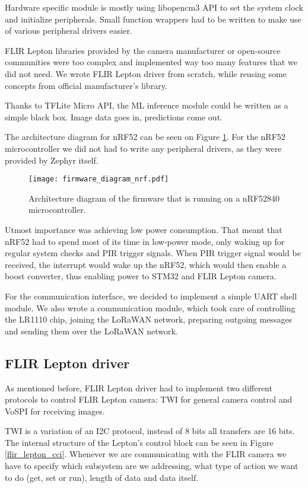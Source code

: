 Hardware specific module is mostly using libopencm3 API to set the system clock and initialize peripherals.
Small function wrappers had to be written to make use of various peripheral drivers easier.

FLIR Lepton libraries provided by the camera manufacturer or open-source communities were too complex and implemented way too many features that we did not need.
We wrote FLIR Lepton driver from scratch, while reusing some concepts from official manufacturer's library.

Thanks to TFLite Micro API, the ML inference module could be written as a simple black box.
Image data goes in, predictions come out.

The architecture diagram for nRF52 can be seen on Figure \ref{firmware_diagram_wisent}.
For the nRF52 microcontroller we did not had to write any peripheral drivers, as they were provided by Zephyr itself.

\begin{figure}[ht]
        \centering
        \texttt{[image: firmware\_diagram\_nrf.pdf]} 
        \caption{ Architecture diagram of the firmware that is running on a nRF52840 microcontroller.} 
        \label{firmware_diagram_wisent}
\end{figure}

Utmost importance was achieving low power consumption.
That meant that nRF52 had to spend most of its time in low-power mode, only waking up for regular system checks and PIR trigger signals.
When PIR trigger signal would be received, the interrupt would wake up the nRF52, which would then enable a boost converter, thus enabling power to STM32 and FLIR Lepton camera.

For the communication interface, we decided to implement a simple UART shell module.
We also wrote a communication module, which took care of controlling the LR1110 chip, joining the LoRaWAN network, preparing outgoing messages and sending them over the LoRaWAN network.


\subsection{ FLIR Lepton driver}

As mentioned before, FLIR Lepton driver had to implement two different protocols to control FLIR Lepton camera: TWI for general camera control and VoSPI for receiving images.

TWI is a variation of an I2C protocol, instead of 8 bits all transfers are 16 bits.
The internal structure of the Lepton's control block can be seen in Figure \ref{flir_lepton_cci}.
Whenever we are communicating with the FLIR camera we have to specify which subsystem are we addressing, what type of action we want to do (get, set or run), length of data and data itself.

